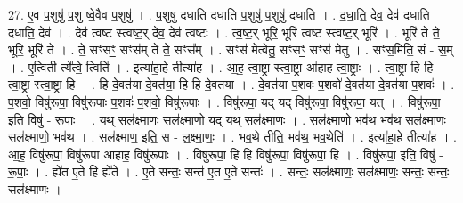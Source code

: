 \documentclass[17pt]{extarticle}
\begin{document}
27. ए॒व प॒शुषु॑ प॒शु ष्वे॒वैव प॒शुषु॑ । . प॒शुषु॑ दधाति दधाति प॒शुषु॑ प॒शुषु॑ दधाति । . द॒धा॒ति॒ देव॒ देव॑ दधाति दधाति॒ देव॑ । . देव॑ त्वष्ट स्त्वष्ट॒र् देव॒ देव॑ त्वष्टः । . त्व॒ष्ट॒र् भूरि॒ भूरि॑ त्वष्ट स्त्वष्ट॒र् भूरि॑ । . भूरि॑ ते ते॒ भूरि॒ भूरि॑ ते । . ते॒ सꣳसꣳ॒॒ सꣳस॑म् ते ते॒ सꣳस᳚म् । . सꣳस॑ मेत्वेतु॒ सꣳसꣳ॒॒ सꣳस॑ मेतु । . सꣳस॒मिति॒ सं - स॒म् । . ए॒त्विती त्ये᳚त्वे॒ त्विति॑ । . इत्या॑हा॒हे तीत्या॑ह । . आ॒ह॒ त्वा॒ष्ट्रा स्त्वा॒ष्ट्रा आ॑हाह त्वा॒ष्ट्राः । . त्वा॒ष्ट्रा हि हि त्वा॒ष्ट्रा स्त्वा॒ष्ट्रा हि । . हि दे॒वत॑या दे॒वत॑या॒ हि हि दे॒वत॑या । . दे॒वत॑या प॒शवः॑ प॒शवो॑ दे॒वत॑या दे॒वत॑या प॒शवः॑ । . प॒शवो॒ विषु॑रूपा॒ विषु॑रूपाः प॒शवः॑ प॒शवो॒ विषु॑रूपाः । . विषु॑रूपा॒ यद् यद् विषु॑रूपा॒ विषु॑रूपा॒ यत् । . विषु॑रूपा॒ इति॒ विषु॑ - रू॒पाः॒ । . यथ् सल॑क्ष्माणः॒ सल॑क्ष्माणो॒ यद् यथ् सल॑क्ष्माणः । . सल॑क्ष्माणो॒ भव॑थ॒ भव॑थ॒ सल॑क्ष्माणः॒ सल॑क्ष्माणो॒ भव॑थ । . सल॑क्ष्माण॒ इति॒ स - ल॒क्ष्मा॒णः॒ । . भव॒थे तीति॒ भव॑थ॒ भव॒थेति॑ । . इत्या॑हा॒हे तीत्या॑ह । . आ॒ह॒ विषु॑रूपा॒ विषु॑रूपा आहाह॒ विषु॑रूपाः । . विषु॑रूपा॒ हि हि विषु॑रूपा॒ विषु॑रूपा॒ हि । . विषु॑रूपा॒ इति॒ विषु॑ - रू॒पाः॒ । . ह्ये॑त ए॒ते हि ह्ये॑ते । . ए॒ते सन्तः॒ सन्त॑ ए॒त ए॒ते सन्तः॑ । . सन्तः॒ सल॑क्ष्माणः॒ सल॑क्ष्माणः॒ सन्तः॒ सन्तः॒ सल॑क्ष्माणः । \newline
\end{document}
